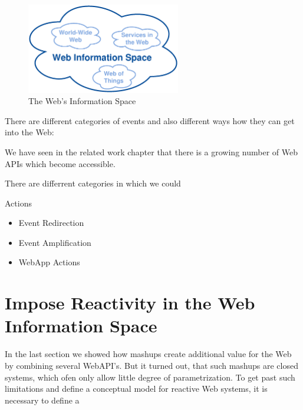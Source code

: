 \begin{figure}[!ht]
  \centering
  \includegraphics[width=0.6\textwidth]{figures/InformationSpace}
  \caption{The Web's Information Space}
  \label{fig:InformationSpace}
\end{figure}
There are different categories of events and also different ways how they can get into the Web:

We have seen in the related work chapter that there is a growing number of Web APIs which become accessible.


There are differrent categories in which we could 

Actions
\begin{itemize}
  \item Event Redirection
  \item Event Amplification
  \item WebApp Actions
\end{itemize}


\section{Impose Reactivity in the Web Information Space}


In the last section we showed how mashups create additional value for the Web by combining several WebAPI's.
But it turned out, that such mashups are closed systems, which ofen only allow little degree of parametrization.
To get past such limitations and define a conceptual model for reactive Web systems, it is necessary to define a 


